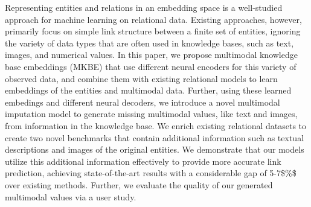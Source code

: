 Representing entities and relations in an embedding space is a well-studied approach for machine learning on relational data. Existing approaches, however, primarily focus on simple link structure between a finite set of entities, ignoring the variety of data types that are often used in knowledge bases, such as text, images, and numerical values. In this paper, we propose multimodal knowledge base embeddings (MKBE) that use different neural encoders for this variety of observed data, and combine them with existing relational models to learn embeddings of the entities and multimodal data. Further, using these learned embedings and different neural decoders, we introduce a novel multimodal imputation model to generate missing multimodal values, like text and images, from information in the knowledge base. We enrich existing relational datasets to create two novel benchmarks that contain additional information such as textual descriptions and images of the original entities. We demonstrate that our models utilize this additional information effectively to provide more accurate link prediction, achieving state-of-the-art results with a considerable gap of 5-7\$\%\$ over existing methods. Further, we evaluate the quality of our generated multimodal values via a user study.
